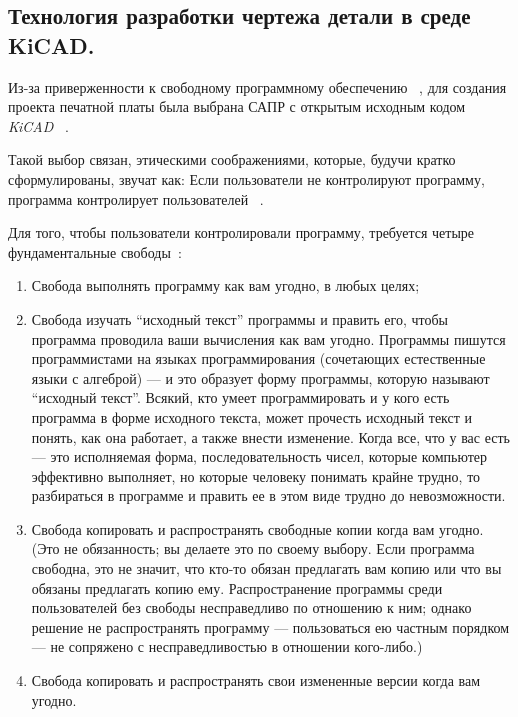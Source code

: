 \subsection{Технология разработки чертежа детали в среде KiCAD.}
Из-за приверженности к свободному программному обеспечению
~\cite{GNU-philosophy}, для создания проекта печатной платы была
выбрана САПР с открытым исходным кодом \textit{KiCAD}
~\cite{kicad-license}.

Такой выбор связан, этическими соображениями, которые, будучи
кратко сформулированы, звучат как:
Если пользователи не контролируют программу,
программа контролирует пользователей ~\cite{unfair-nonfree-programms}.

Для того, чтобы пользователи контролировали программу, требуется
четыре фундаментальные свободы~\cite{unfair-nonfree-programms}:

\begin{enumerate}
\item Свобода выполнять программу как вам угодно, в любых целях;
  
\item Свобода изучать “исходный текст” программы и править его, чтобы
программа проводила ваши вычисления как вам угодно. Программы пишутся
программистами на языках программирования (сочетающих естественные
языки с алгеброй) — и это образует форму программы, которую называют
“исходный текст”. Всякий, кто умеет программировать и у кого есть
программа в форме исходного текста, может прочесть исходный текст и
понять, как она работает, а также внести изменение. Когда все, что у
вас есть — это исполняемая форма, последовательность чисел, которые
компьютер эффективно выполняет, но которые человеку понимать крайне
трудно, то разбираться в программе и править ее в этом виде трудно до
невозможности.

\item  Свобода копировать и распространять свободные копии когда вам
угодно. (Это не обязанность; вы делаете это по своему выбору. Если
программа свободна, это не значит, что кто-то обязан предлагать вам
копию или что вы обязаны предлагать копию ему. Распространение
программы среди пользователей без свободы несправедливо по отношению к
ним; однако решение не распространять программу — пользоваться ею
частным порядком — не сопряжено с несправедливостью в отношении
кого-либо.)

\item Свобода копировать и распространять свои измененные версии когда
вам угодно.
\end{enumerate}


